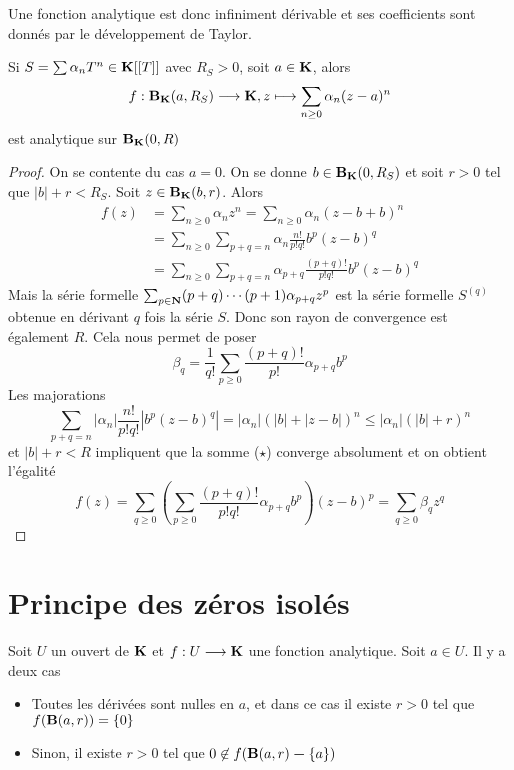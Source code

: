 \begin{rem}
Une fonction analytique est donc infiniment dérivable et ses coefficients sont donnés par le développement de Taylor.
\end{rem}

\begin{thm}
    Si $S=\sum \alpha_nT^n \in \mathbf K [[T]]$ avec $R_S>0$, soit $a \in  \mathbf K$, alors \[
        f: \mathbf B_\mathbf K(a, R_S) \longrightarrow \mathbf K, z \longmapsto \sum_{n\geq 0} \alpha_n(z-a)^n
    \] 
    est analytique sur $\mathbf B_\mathbf K(0, R)$
\end{thm}

\begin{proof}
    On se contente du cas $a=0$. On se donne  $b \in  \mathbf B_\mathbf K(0, R_S)$ et soit $r >0$ tel que $|b|+r<R_S$. Soit  $z \in  \mathbf B_\mathbf K(b, r)$. Alors
\begin{align*}
f(z) &=\sum_{n \geq 0} \alpha_{n} z^{n}=\sum_{n \geq 0} \alpha_{n}(z-b+b)^{n} \\
&=\sum_{n \geq 0} \sum_{p+q=n} \alpha_{n} \frac{n !}{p ! q !} b^{p}(z-b)^{q} \\
&=\sum_{n \geq 0} \sum_{p+q=n} \alpha_{p+q} \frac{(p+q) !}{p ! q !} b^{p}(z-b)^{q} \tag{$\star$}
\end{align*}
Mais la série formelle $\sum_{p \in \mathbf N}(p+q) \cdots(p+1) \alpha_{p+q} z^{p}$ est la série formelle $S^{(q)}$ obtenue en dérivant $q$ fois la série $S .$ Donc son rayon de convergence est également $R$. Cela nous permet de poser
\[
\beta_{q}=\frac{1}{q !} \sum_{p \geq 0} \frac{(p+q) !}{p !} \alpha_{p+q} b^{p}
\]
Les majorations
\[
\sum_{p+q=n}\left|\alpha_{n}\right| \frac{n !}{p ! q !}\left|b^{p}(z-b)^{q}\right|=\left|\alpha_{n}\right|(|b|+|z-b|)^{n} \leq\left|\alpha_{n}\right|(|b|+r)^{n}
\]
et $|b|+r<R$ impliquent que la somme ($\star$) converge absolument et on obtient l'égalité
\[
f(z)=\sum_{q \geq 0}\left(\sum_{p \geq 0} \frac{(p+q) !}{p ! q !} \alpha_{p+q} b^{p}\right)(z-b)^{p}=\sum_{q \geq 0} \beta_{q} z^{q}
\]
\end{proof}

\section{Principe des zéros isolés}

\begin{thm}
Soit $U$ un ouvert de  $\mathbf K$ et $f:U \longrightarrow \mathbf K$ une fonction analytique. Soit $a \in U$. Il y a deux cas \begin{itemize}
    \item Toutes les dérivées sont nulles en $a$, et dans ce cas il existe  $r>0$ tel que  $f(\mathbf B(a, r))= \left\{ 0 \right\} $ 
    \item Sinon, il existe $r>0$ tel que  $0 \not \in f(\mathbf B(a, r)\bm- \left\{ a \right\} )$
\end{itemize}
\end{thm}

